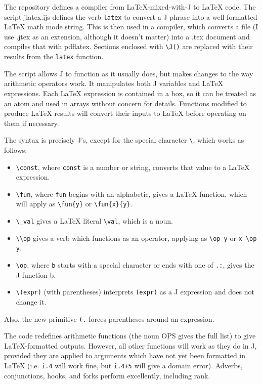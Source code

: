 \documentclass{article}
\newcommand{\code}[1]{\lstinline`#1`}
\begin{document}
The repository defines a compiler from LaTeX-mixed-with-J to LaTeX code.
The script jlatex.ijs defines the verb \code{latex} to convert a J phrase
into a well-formatted LaTeX math mode string.  This is then used in a
compiler, which converts a file (I use .jtex as an extension, although
it doesn't matter) into a .tex document and compiles that with pdflatex.
Sections enclosed with \code{\J()} are replaced with their results
from the \code{latex} function.

The script allows J to function as it usually does, but makes changes to
the way arithmetic operators work. It manipulates both J variables and
LaTeX expressions. Each LaTeX expression is contained in a box, so it can
be treated as an atom and used in arrays without concern for details.
Functions modified to produce LaTeX results will convert their inputs
to LaTeX before operating on them if necessary.

The syntax is precisely J's, except for the special character
\lstinline`\`, which works as follows:
\begin{itemize}
  \item \lstinline`\const`, where \code{const} is a number or string,
    converts that value to a LaTeX expression.
  \item \lstinline`\fun`, where \code{fun} begins with an alphabetic,
    gives a LaTeX function, which will apply as \lstinline`\fun{y}`
    or \lstinline`\fun{x}{y}`.
  \item \lstinline`\_val` gives a LaTeX literal \lstinline`\val`, which is a noun.
  \item \lstinline`\\op` gives a verb which functions as an operator,
    applying as \lstinline`\op y` or \lstinline`x \op y`.
  \item \lstinline`\op`, where \code{b} starts with a special character or
    ends with one of \code{.:}, gives the J function b.
  \item \lstinline`\(expr)` (with parentheses) interprets \code{(expr)}
    as a J expression and does not change it.
\end{itemize}

Also, the new primitive \code{(.} forces parentheses around an expression.

The code redefines arithmetic functions (the noun OPS gives the full list)
to give LaTeX-formatted outputs. However, all other functions will work as
they do in J, provided they are applied to arguments which have not yet
been formatted in LaTeX (i.e. \code{i.4} will work fine, but \code{i.4+5}
will give a domain error). Adverbs, conjunctions, hooks, and forks perform
excellently, including rank.
\end{document}
